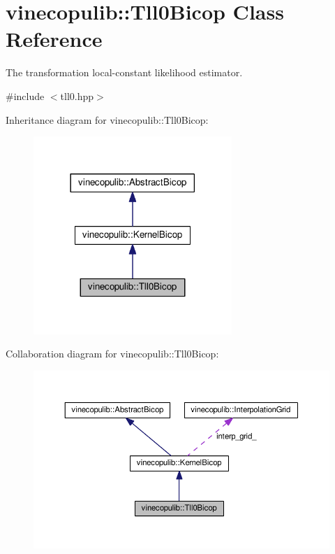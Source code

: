 \hypertarget{classvinecopulib_1_1_tll0_bicop}{}\section{vinecopulib\+:\+:Tll0\+Bicop Class Reference}
\label{classvinecopulib_1_1_tll0_bicop}


The transformation local-\/constant likelihood estimator.  




{\ttfamily \#include $<$tll0.\+hpp$>$}



Inheritance diagram for vinecopulib\+:\+:Tll0\+Bicop\+:\nopagebreak
\begin{figure}[H]
\begin{center}
\leavevmode
\includegraphics[width=213pt]{classvinecopulib_1_1_tll0_bicop__inherit__graph}
\end{center}
\end{figure}


Collaboration diagram for vinecopulib\+:\+:Tll0\+Bicop\+:\nopagebreak
\begin{figure}[H]
\begin{center}
\leavevmode
\includegraphics[width=350pt]{classvinecopulib_1_1_tll0_bicop__coll__graph}
\end{center}
\end{figure}
